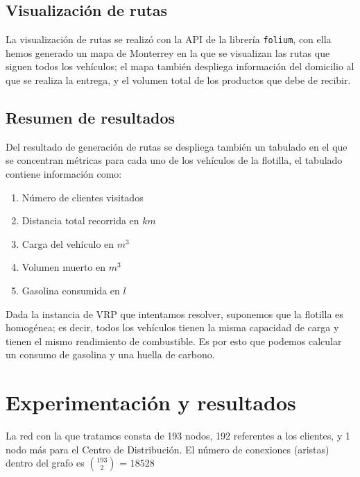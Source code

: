 \documentclass[journal]{IEEEtran}
\begin{document}
        \subsection{Visualización de rutas} 
            
            La visualización de rutas se realizó con la API de la librería \texttt{folium}, con ella hemos generado un mapa de Monterrey en la que se visualizan las rutas que siguen todos los vehículos; el mapa también despliega información del domicilio al que se realiza la entrega, y el volumen total de los productos que debe de recibir.
        
        \subsection{Resumen de resultados}

            Del resultado de generación de rutas se despliega también un tabulado en el que se concentran métricas para cada uno de los vehículos de la flotilla, el tabulado contiene información como:
            \begin{enumerate}
                \item Número de clientes visitados
                \item Distancia total recorrida en $km$
                \item Carga del vehículo en $m^{3}$
                \item Volumen muerto en $m^{3}$
                \item Gasolina consumida en $l$
            \end{enumerate}

            Dada la instancia de VRP que intentamos resolver, suponemos que la flotilla es homogénea; es decir, todos los vehículos tienen la misma capacidad de carga y tienen el mismo rendimiento de combustible. Es por esto que podemos calcular un consumo de gasolina y una huella de carbono.
            
    \section{Experimentación y resultados} \label{sec:experimentation}
    
        La red con la que tratamos consta de 193 nodos, 192 referentes a los clientes, y 1 nodo más para el Centro de Distribución. El número de conexiones (aristas) dentro del grafo es $193\choose2$ = $18528$
        
\end{document}
